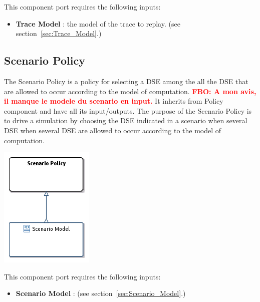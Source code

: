 \documentclass{gemoc} %
\begin{document}
This component port requires the following inputs:
\begin{itemize}
  \item \textbf{Trace Model} :
the model of the trace to replay.
(see section~\ref{sec:Trace_Model}.)
\end{itemize}



\subsection{Scenario Policy}
\label{sec:Scenario_Policy}
The Scenario Policy is a policy for selecting a DSE among the all the DSE that are allowed to occur according to the model of computation.
\textcolor{red}{\textbf{FBO: A mon avis, il manque le modele du scenario en input.}}
It inherits from Policy component and have all its input/outputs.
The purpose of the Scenario Policy is to drive a simulation by choosing the DSE indicated in a scenario when several DSE when several DSE are allowed to occur according to the model of computation.
\begin{center}
\includegraphics*[trim=0.0cm 0.0cm 0cm 0.0cm, clip=true]{../images/generated/Generated_Scenario_Policy.png}
\end{center}

This component port requires the following inputs:
\begin{itemize}
  \item \textbf{Scenario Model} :
(see section~\ref{sec:Scenario_Model}.)
\end{itemize}
\end{document}
